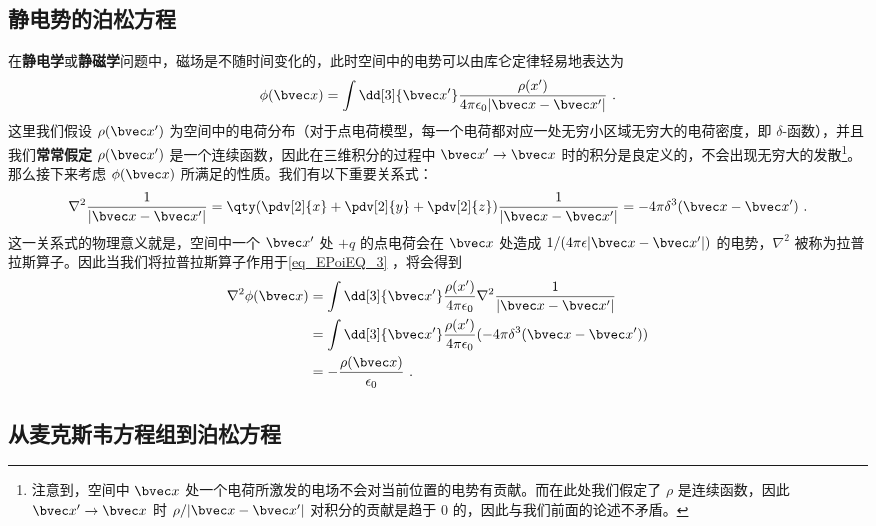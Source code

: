 

\subsection{静电势的泊松方程}
在\textbf{静电学}或\textbf{静磁学}问题中，磁场是不随时间变化的，此时空间中的电势可以由库仑定律轻易地表达为
\begin{equation}\label{eq_EPoiEQ_3}
\phi(\bvec x) = \int \dd[3]{\bvec x'} \frac{\rho(x')}{4\pi \epsilon_0|\bvec x-\bvec x'|}~.
\end{equation}
这里我们假设 $\rho(\bvec x')$ 为空间中的电荷分布（对于点电荷模型，每一个电荷都对应一处无穷小区域无穷大的电荷密度，即 $\delta$-函数），并且我们\textbf{常常假定} $\rho(\bvec x')$ 是一个连续函数，因此在三维积分的过程中 $\bvec x'\rightarrow \bvec x$ 时的积分是良定义的，不会出现无穷大的发散\footnote{注意到，空间中 $\bvec x$ 处一个电荷所激发的电场不会对当前位置的电势有贡献。而在此处我们假定了 $\rho$ 是连续函数，因此 $\bvec x'\rightarrow \bvec x$ 时 $\rho/|\bvec x-\bvec x'|$ 对积分的贡献是趋于 $0$ 的，因此与我们前面的论述不矛盾。}。那么接下来考虑 $\phi(\bvec x)$ 所满足的性质。我们有以下重要关系式：
\begin{equation}
\nabla^2 \frac{1}{|\bvec x-\bvec x'|} = \qty(\pdv[2]{x}+\pdv[2]{y}+\pdv[2]{z}) \frac{1}{|\bvec x-\bvec x'|}= -4\pi\delta^3(\bvec x-\bvec x')~.
\end{equation}
这一关系式的物理意义就是，空间中一个 $\bvec x'$ 处 $+q$ 的点电荷会在 $\bvec x$ 处造成 $1/(4\pi\epsilon |\bvec x-\bvec x'|)$ 的电势，$\nabla^2$ 被称为拉普拉斯算子。因此当我们将拉普拉斯算子作用于\autoref{eq_EPoiEQ_3} ，将会得到
\begin{equation}
\begin{aligned}
\nabla^2\phi(\bvec x) &= \int \dd[3]{\bvec x'}\frac{\rho(x')}{4\pi \epsilon_0} \nabla^2 \frac{1}{|\bvec x-\bvec x'|} \\
&= \int \dd[3]{\bvec x'}\frac{\rho(x')}{4\pi \epsilon_0} ( -4\pi\delta^3(\bvec x-\bvec x'))\\
&= -\frac{\rho(\bvec x)}{\epsilon_0}~.
\end{aligned}
\end{equation}

\subsection{从麦克斯韦方程组到泊松方程}

